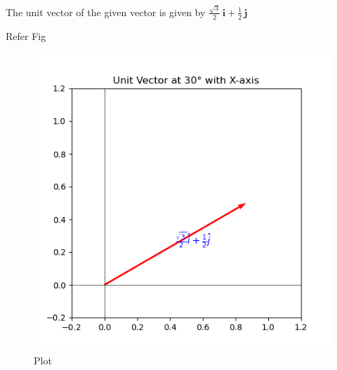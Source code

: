 \documentclass[journal]{IEEEtran}
\begin{document}
The unit  vector of the given vector is given by
 $\frac{\sqrt{3}}{2}\,\mathbf{i} + \frac{1}{2}\,\mathbf{j}$



Refer Fig
\begin{figure}
    \centering
\includegraphics[width=0.8\columnwidth]{figs/Figure _2.png}
    \caption{Plot}
    \label{fig:placeholder}
\end{figure}
\end{document}
